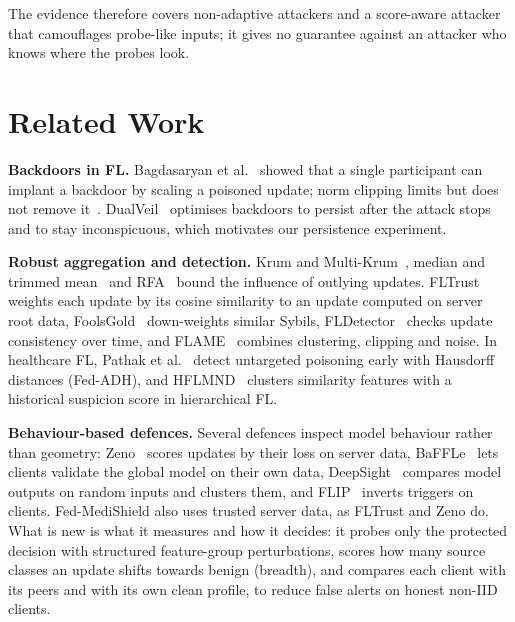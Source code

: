 \documentclass[conference]{IEEEtran}
\begin{document}
The evidence therefore covers non-adaptive attackers and a score-aware attacker that camouflages probe-like inputs; it gives no guarantee against an attacker who knows where the probes look.

\section{Related Work}
\textbf{Backdoors in FL.} Bagdasaryan et al.~\cite{bagdasaryan2020backdoor} showed that a single participant can implant a backdoor by scaling a poisoned update; norm clipping limits but does not remove it~\cite{sun2019canyou}. DualVeil~\cite{zhang2026dualveil} optimises backdoors to persist after the attack stops and to stay inconspicuous, which motivates our persistence experiment.

\textbf{Robust aggregation and detection.} Krum and Multi-Krum~\cite{blanchard2017krum}, median and trimmed mean~\cite{yin2018median} and RFA~\cite{pillutla2022rfa} bound the influence of outlying updates. FLTrust~\cite{cao2021fltrust} weights each update by its cosine similarity to an update computed on server root data, FoolsGold~\cite{fung2020foolsgold} down-weights similar Sybils, FLDetector~\cite{zhang2022fldetector} checks update consistency over time, and FLAME~\cite{nguyen2022flame} combines clustering, clipping and noise. In healthcare FL, Pathak et al.~\cite{pathak2026early} detect untargeted poisoning early with Hausdorff distances (Fed-ADH), and HFLMND~\cite{bi2026hflmnd} clusters similarity features with a historical suspicion score in hierarchical FL.

\textbf{Behaviour-based defences.} Several defences inspect model behaviour rather than geometry: Zeno~\cite{xie2019zeno} scores updates by their loss on server data, BaFFLe~\cite{andreina2021baffle} lets clients validate the global model on their own data, DeepSight~\cite{rieger2022deepsight} compares model outputs on random inputs and clusters them, and FLIP~\cite{zhang2023flip} inverts triggers on clients. Fed-MediShield also uses trusted server data, as FLTrust and Zeno do. What is new is what it measures and how it decides: it probes only the protected decision with structured feature-group perturbations, scores how many source classes an update shifts towards benign (breadth), and compares each client with its peers and with its own clean profile, to reduce false alerts on honest non-IID clients.
\end{document}
